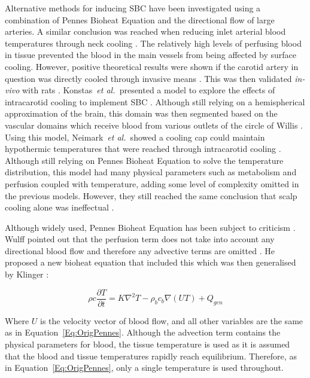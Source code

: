 \documentclass[11pt,english,a4paper,twoside,openright]{report}
\begin{document}
{{{{{{{{	Alternative methods for inducing SBC have been investigated using a combination of Pennes Bioheat Equation and the directional flow of large arteries. A similar conclusion was reached when reducing inlet arterial blood temperatures through neck cooling \cite{nunneley1994limitations}\cite{zhu2000theoretical}. The relatively high levels of perfusing blood in tissue prevented the blood in the main vessels from being affected by surface cooling. However, positive theoretical results were shown if the carotid artery in question was directly cooled through invasive means \cite{wang2007targeted}. This was then validated \textit{in-vivo} with rats \cite{wang2008targeted}. Konstas~\textit{et al.\ }presented a model to explore the effects of intracarotid cooling to implement SBC \cite{konstas2007theoretical}. Although still relying on a hemispherical approximation of the brain, this domain was then segmented based on the vascular domains which receive blood from various outlets of the circle of Willis \cite{neimark2007integration}. Using this model, Neimark~\textit{et al.\ }showed a cooling cap could maintain hypothermic temperatures that were reached through intracarotid cooling \cite{neimark2008brain}. Although still relying on Pennes Bioheat Equation to solve the temperature distribution, this model had many physical parameters such as metabolism and perfusion coupled with temperature, adding some level of complexity omitted in the previous models. However, they still reached the same conclusion that scalp cooling alone was ineffectual \cite{neimark2008brain}.  
	
	Although widely used, Pennes Bioheat Equation has been subject to criticism \cite{nelson1998invited}. Wulff pointed out that the perfusion term does not take into account any directional blood flow and therefore any advective terms are omitted \cite{wulff1974energy}. He proposed a new bioheat equation that included this which was then generalised by Klinger \cite{klinger1978heat}:
	
	\begin{equation}
	\rho c\frac{\partial T}{\partial t} = K\nabla^{2}T -\rho_{b}c_{b}\nabla(UT) + Q_{gen}
	\label{Eq:OrigWulffKinger}
	\end{equation}
	
	Where $U$ is the velocity vector of blood flow, and all other variables are the same as in Equation~\ref{Eq:OrigPennes}. Although the advection term contains the physical parameters for blood, the tissue temperature is used as it is assumed that the blood and tissue temperatures rapidly reach equilibrium. Therefore, as in Equation~\ref{Eq:OrigPennes}, only a single temperature is used throughout.
	
}}}}}}}}
\end{document}
